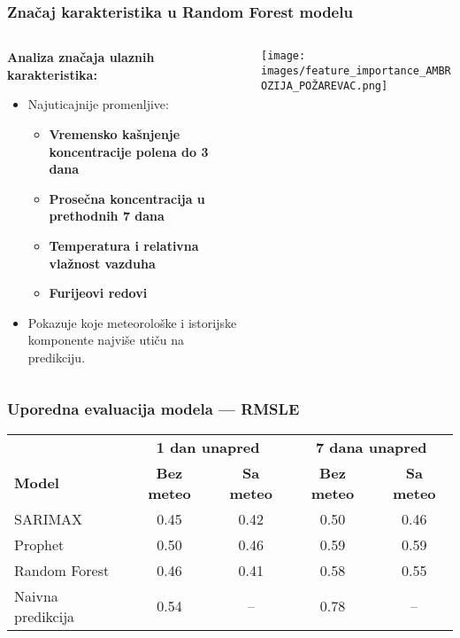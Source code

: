 \begin{frame}
    \frametitle{Značaj karakteristika u Random Forest modelu}

    \begin{columns}[T, totalwidth=\textwidth]
        \begin{column}{0.55\textwidth}
            \textbf{Analiza značaja ulaznih karakteristika:}

            \begin{itemize}
                \item Najuticajnije promenljive: 
                \begin{itemize}
                    \item \textbf{Vremensko kašnjenje koncentracije polena do 3 dana}
                    \item \textbf{Prosečna koncentracija u prethodnih 7 dana}
                    \item \textbf{Temperatura i relativna vlažnost vazduha}
                    \item \textbf{Furijeovi redovi}
                \end{itemize}
                \item Pokazuje koje meteorološke i istorijske komponente najviše utiču na predikciju.
            \end{itemize}
        \end{column}

        \begin{column}{0.45\textwidth}
            \centering
            \texttt{[image: images/feature\_importance\_AMBROZIJA\_POŽAREVAC.png]}
        \end{column}
    \end{columns}

\end{frame}



\begin{frame}
    \frametitle{Uporedna evaluacija modela — RMSLE}

    \centering
    \small
    \begin{tabular}{lcccc}
        \toprule
        & \multicolumn{2}{c}{\textbf{1 dan unapred}} & \multicolumn{2}{c}{\textbf{7 dana unapred}} \\
        \cmidrule(lr){2-3} \cmidrule(lr){4-5}
        \textbf{Model} & \textbf{Bez meteo} & \textbf{Sa meteo} & \textbf{Bez meteo} & \textbf{Sa meteo} \\
        \midrule
        SARIMAX & 0.45 & 0.42 & 0.50 & 0.46 \\
        Prophet & 0.50 & 0.46 & 0.59 & 0.59 \\
        Random Forest & 0.46 & 0.41 & 0.58 & 0.55 \\
        Naivna predikcija & 0.54 & -- & 0.78 & -- \\
        \bottomrule
    \end{tabular}

    \vspace{0.3cm}
\end{frame}
